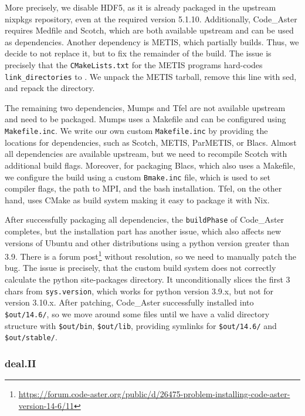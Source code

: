 \documentclass{eceasst}
\begin{document}
More precisely, we disable HDF5, as it is already packaged in the upstream nixpkgs repository, even at the required version 5.1.10.
Additionally, Code\_Aster requires Medfile and Scotch, which are both available upstream and can be used as dependencies.
Another dependency is METIS, which partially builds. Thus, we decide to not replace it, but to fix the remainder of the build.
The issue is precisely that the \texttt{CMakeLists.txt} for the METIS programs hard-codes \texttt{link\_directories} to .
We unpack the METIS tarball, remove this line with sed, and repack the directory.

The remaining two dependencies, Mumps and Tfel are not available upstream and need to be packaged.
Mumps uses a Makefile and can be configured using \texttt{Makefile.inc}.
We write our own custom \texttt{Makefile.inc} by providing the locations for dependencies, such as Scotch, METIS, ParMETIS, or Blacs.
Almost all dependencies are available upstream, but we need to recompile Scotch with additional build flags.
Moreover, for packaging Blacs, which also uses a Makefile, we configure the build using a custom \texttt{Bmake.inc} file, which is used to set compiler flags, the path to MPI, and the bash installation.
Tfel, on the other hand, uses CMake as build system making it easy to package it with Nix.

After successfully packaging all dependencies, the \texttt{buildPhase} of Code\_Aster completes, but the installation part has another issue, which also affects new versions of Ubuntu and other distributions using a python version greater than 3.9.
There is a forum post\footnote{\url{https://forum.code-aster.org/public/d/26475-problem-installing-code-aster-version-14-6/11}} without resolution, so we need to manually patch the bug.
The issue is precisely, that the custom build system does not correctly calculate the python site-packages directory.
It unconditionally slices the first 3 chars from \texttt{sys.version}, which works for python version 3.9.x, but not for version 3.10.x.
After patching, Code\_Aster successfully installed into \texttt{\$out/14.6/}, so we move around some files until we have a valid directory structure with \texttt{\$out/bin}, \texttt{\$out/lib}, providing symlinks for \texttt{\$out/14.6/} and \texttt{\$out/stable/}.

\subsubsection{deal.II}
\end{document}
